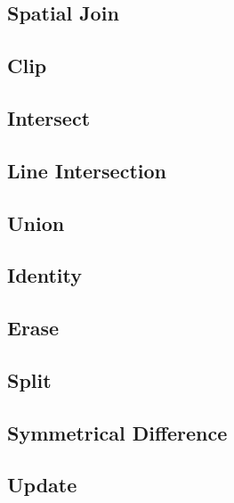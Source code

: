 \documentclass[
]{book}
\begin{document}
\hypertarget{spatial-join}{%
\subsection{Spatial Join}\label{spatial-join}}

\hypertarget{clip}{%
\subsection{Clip}\label{clip}}

\hypertarget{intersect}{%
\subsection{Intersect}\label{intersect}}

\hypertarget{line-intersection}{%
\subsection{Line Intersection}\label{line-intersection}}

\hypertarget{union}{%
\subsection{Union}\label{union}}

\hypertarget{identity}{%
\subsection{Identity}\label{identity}}

\hypertarget{erase}{%
\subsection{Erase}\label{erase}}

\hypertarget{split}{%
\subsection{Split}\label{split}}

\hypertarget{symmetrical-difference}{%
\subsection{Symmetrical Difference}\label{symmetrical-difference}}

\hypertarget{update}{%
\subsection{Update}\label{update}}
\end{document}
